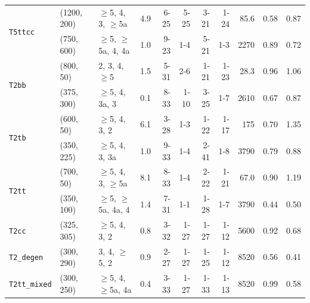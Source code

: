 \begin{table}[tb]
\begin{tabular}{ lllcrrrrrcc }
    \multirow{2}{*}{\texttt{T5ttcc}}  
  & (1200, 200) & $\geq$5, 4, 3, $\geq$5a  & \phantom{1}4.9 & 6-25  & 5-25    & 3-21  & 1-24 & 85.6 & 0.58 & 0.87 \\
  & (750, 600)  & $\geq$5, $\geq$5a, 4, 4a & \phantom{1}1.0 & 9-23  & 1-4     & 5-21  & 1-3  & 2270 & 0.89 & 0.72 \\ [0.5ex]
    \multirow{2}{*}{\texttt{T2bb}}
  & (800, 50)   & 2, 3, 4, $\geq$5         & \phantom{1}1.5 & 5-31  & 2-6     & 1-21  & 1-23 & 28.3 & 0.96 & 1.06 \\
  & (375, 300)  & $\geq$5, 4, 3a, 3        & \phantom{1}0.1 & 8-33  & 1-10    & 3-25  & 1-7  & 2610 & 0.67 & 0.87 \\ [0.5ex]
    \multirow{2}{*}{\texttt{T2tb}}
  & (600, 50)   & $\geq$5, 4, 3, 2         & \phantom{1}6.1 & 3-28  & 1-3     & 1-22  & 1-17 & 175  & 0.70 & 1.35 \\
  & (350, 225)  & $\geq$5, 4, 3, 3a        & \phantom{1}1.0 & 9-33  & 1-4     & 2-41  & 1-8  & 3790 & 0.79 & 0.88 \\ [0.5ex]
    \multirow{2}{*}{\texttt{T2tt}}
  & (700, 50)   & $\geq$5, 4, 3, $\geq$5a  & \phantom{1}8.1 & 8-33  & 1-4     & 2-22  & 1-21 & 67.0 & 0.90 & 1.19 \\
  & (350, 100)  & $\geq$5, $\geq$5a, 4a, 4 & \phantom{1}1.4 & 7-31  & 1-1     & 1-28  & 1-7  & 3790 & 0.44 & 0.50 \\ [0.5ex]
    \multirow{1}{*}{\texttt{T2cc}}
  & (325, 305)  & $\geq$5, 4, 3, 2         & \phantom{1}0.8 & 3-32  & 1-27    & 1-27  & 1-12 & 5600 & 0.92 & 0.68 \\ [0.5ex]
    \multirow{1}{*}{\texttt{T2\_degen}}
  & (300, 290)  & 3, 4, $\geq$5, 2         & \phantom{1}0.9 & 2-27  & 1-27    & 1-25  & 1-12 & 8520 & 0.56 & 0.41 \\ [0.5ex]
    \multirow{1}{*}{\texttt{T2tt\_mixed}}
  & (300, 250)  & $\geq$5, 4, $\geq$5a, 4a & \phantom{1}0.4 & 3-33  & 1-27    & 1-33  & 1-13 & 8520 & 0.99 & 0.58 \\ [0.5ex]
    \hline
  \end{tabular}
\end{table}

